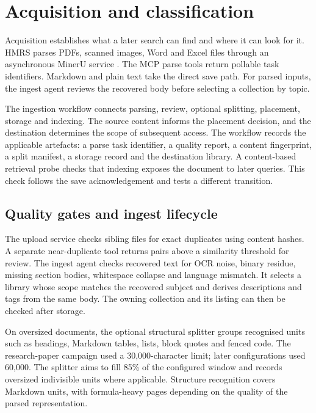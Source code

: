 \section{Acquisition and classification}
\label{sec:acquisition}

Acquisition establishes what a later search can find and where it can
look for it. HMRS parses PDFs, scanned images, Word and Excel files through
an asynchronous MinerU service \citep{mineru}. The MCP parse tools return
pollable task identifiers. Markdown and plain text take the direct save
path. For parsed inputs, the ingest agent reviews the recovered body before
selecting a collection by topic.

The ingestion workflow connects parsing, review, optional splitting,
placement, storage and indexing. The source content informs the placement
decision, and the destination determines the scope of subsequent access.
The workflow records the applicable artefacts: a parse task identifier,
a quality report, a content fingerprint, a split manifest, a storage
record and the destination library. A content-based retrieval probe checks
that indexing exposes the document to later queries. This check follows the
save acknowledgement and tests a different transition.

\subsection{Quality gates and ingest lifecycle}

The upload service checks sibling files for exact duplicates using content
hashes. A separate near-duplicate tool returns pairs above a similarity
threshold for review. The ingest agent checks recovered text for OCR noise,
binary residue, missing section bodies, whitespace collapse and language
mismatch. It selects a library whose scope matches the recovered subject and
derives descriptions and tags from the same body. The owning collection and
its listing can then be checked after storage.

On oversized documents, the optional structural splitter groups recognised
units such as headings, Markdown tables, lists, block quotes and fenced code.
The research-paper campaign used a 30,000-character limit; later configurations used
60,000. The splitter aims to fill 85\% of the configured window and records
oversized indivisible units where applicable. Structure recognition covers
Markdown units, with formula-heavy pages depending on the quality of the
parsed representation.

